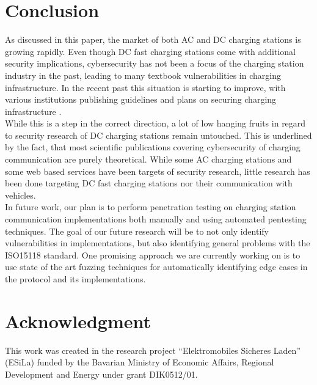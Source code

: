 \documentclass[conference,flushend]{iaria} %
\begin{document}
\section{Conclusion}
As discussed in this paper, the market of both AC and DC charging stations is growing rapidly.
Even though DC fast charging stations come with additional security implications, cybersecurity has not been a focus of the charging station industry in the past, leading to many textbook vulnerabilities in charging infrastructure.
In the recent past this situation is starting to improve, with various institutions publishing guidelines and plans on securing charging infrastructure \cite{mccarthy_cybersecurity_2023, encs_security_nodate}. \\
While this is a step in the correct direction, a lot of low hanging fruits in regard to security research of DC charging stations remain untouched.
This is underlined by the fact, that most scientific publications covering cybersecurity of charging communication are purely theoretical.
While some AC charging stations and some web based services have been targets of security research, little research has been done targeting DC fast charging stations nor their communication with vehicles. \\
In future work, our plan is to perform penetration testing on charging station communication implementations both manually and using automated pentesting techniques.
The goal of our future research will be to not only identify vulnerabilities in implementations, but also identifying general problems with the ISO15118 standard.
One promising approach we are currently working on is to use state of the art fuzzing techniques for automatically identifying edge cases in the protocol and its implementations.

\section*{Acknowledgment}
This work was created in the research project \enquote{Elektromobiles Sicheres Laden} (ESiLa) funded by the Bavarian Ministry of Economic Affairs, Regional Development and Energy under grant DIK0512/01.

\printbibliography
\end{document}

